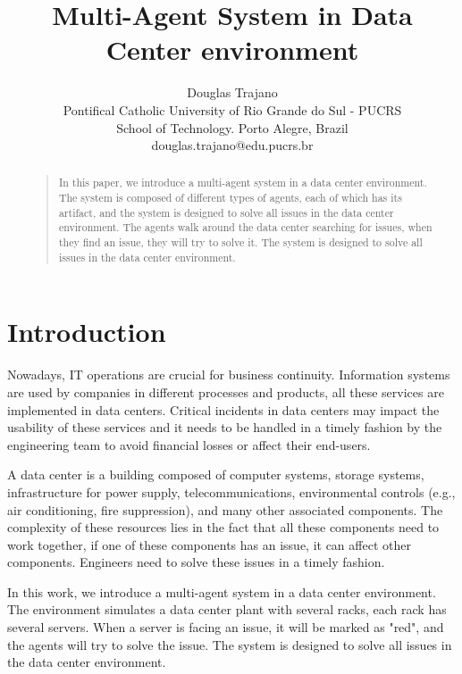 \documentclass[letterpaper]{article}
\begin{document}
%
\title{Multi-Agent System in Data Center environment}
\author{Douglas Trajano\\
Pontifical Catholic University of Rio Grande do Sul - PUCRS\\
School of Technology. Porto Alegre, Brazil\\
douglas.trajano@edu.pucrs.br\\
}
\maketitle
\begin{abstract}
\begin{quote}
In this paper, we introduce a multi-agent system in a data center environment. The system is composed of different types of agents, each of which has its artifact, and the system is designed to solve all issues in the data center environment. The agents walk around the data center searching for issues, when they find an issue, they will try to solve it. The system is designed to solve all issues in the data center environment.
\end{quote}
\end{abstract}

\section{Introduction}

Nowadays, IT operations are crucial for business continuity. Information systems are used by companies in different processes and products, all these services are implemented in data centers. Critical incidents in data centers may impact the usability of these services and it needs to be handled in a timely fashion by the engineering team to avoid financial losses or affect their end-users.

A data center is a building composed of computer systems, storage systems, infrastructure for power supply, telecommunications, environmental controls (e.g., air conditioning, fire suppression), and many other associated components. The complexity of these resources lies in the fact that all these components need to work together, if one of these components has an issue, it can affect other components. Engineers need to solve these issues in a timely fashion.

In this work, we introduce a multi-agent system in a data center environment. The environment simulates a data center plant with several racks, each rack has several servers. When a server is facing an issue, it will be marked as "red", and the agents will try to solve the issue. The system is designed to solve all issues in the data center environment.
\end{document}

